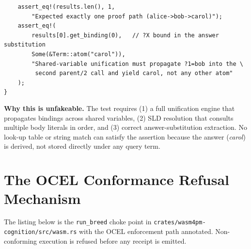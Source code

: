 \begin{verbatim}
    assert_eq!(results.len(), 1,
        "Expected exactly one proof path (alice->bob->carol)");
    assert_eq!(
        results[0].get_binding(0),   // ?X bound in the answer substitution
        Some(&Term::atom("carol")),
        "Shared-variable unification must propagate ?1=bob into the \
         second parent/2 call and yield carol, not any other atom"
    );
}
\end{verbatim}

\noindent
\textbf{Why this is unfakeable.}
The test requires (1) a full unification engine that propagates bindings across
shared variables, (2) SLD resolution that consults multiple body literals in
order, and (3) correct answer-substitution extraction.  No look-up table or
string match can satisfy the assertion because the answer (\textit{carol}) is
derived, not stored directly under any query term.

\section{The OCEL Conformance Refusal Mechanism}
\label{app:ocel-refusal}

The listing below is the \texttt{run\_breed} choke point in
\texttt{crates/wasm4pm-cognition/src/wasm.rs} with the OCEL enforcement path
annotated.  Non-conforming execution is refused before any receipt is emitted.

